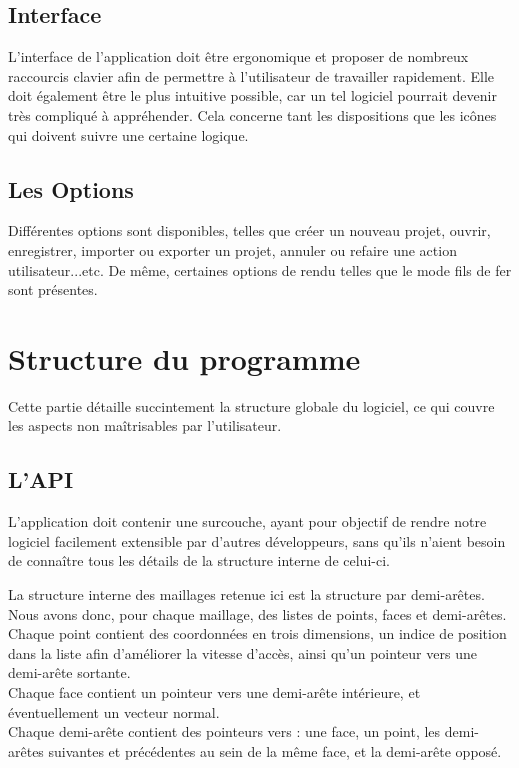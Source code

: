 \documentclass[a4paper]{memoir}
\begin{document}
			\subsection{Interface}
				L'interface de l'application doit être ergonomique et proposer de nombreux raccourcis clavier afin de permettre à l'utilisateur de 
				travailler rapidement. Elle doit également être le plus intuitive possible, car un tel logiciel pourrait devenir très compliqué à 
				appréhender. Cela concerne tant les dispositions que les icônes qui doivent suivre une certaine logique.

			\subsection{Les Options}
				Différentes options sont disponibles, telles que créer un nouveau projet, ouvrir, enregistrer, importer ou exporter un projet, annuler ou 
				refaire une action utilisateur...etc. De même, certaines options de rendu telles que le mode fils de fer sont présentes.
	
		\section{Structure du programme}
			Cette partie détaille succintement la structure globale du logiciel, ce qui couvre les aspects non maîtrisables par l'utilisateur.
			
			\subsection{L'API}
				L'application doit contenir une surcouche, ayant pour objectif de rendre notre logiciel facilement extensible par d'autres développeurs, 
				sans qu'ils n'aient besoin de connaître tous les détails de la structure interne de celui-ci.
				
				La structure interne des maillages retenue ici est la structure par demi-arêtes. Nous avons donc, pour chaque maillage, des listes de 
				points, faces et demi-arêtes.\\ Chaque point contient des coordonnées en trois dimensions, un indice de position dans la liste afin 
				d'améliorer la vitesse d'accès, ainsi qu'un pointeur vers une demi-arête sortante.\\ Chaque face contient un pointeur vers une demi-arête 
				intérieure, et éventuellement un vecteur normal.\\ Chaque demi-arête contient des pointeurs vers : une face, un point, les demi-arêtes 
				suivantes et précédentes au sein de la même face, et la demi-arête opposé.
				
\end{document}

